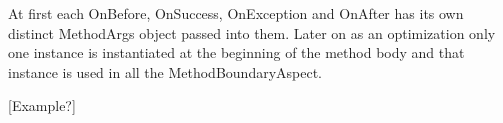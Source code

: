 At first each OnBefore, OnSuccess, OnException and OnAfter has its own distinct MethodArgs object passed into them. Later on as an optimization only one instance is instantiated at the beginning of the method body and that instance is used in all the MethodBoundaryAspect.

[Example?]
%



%
